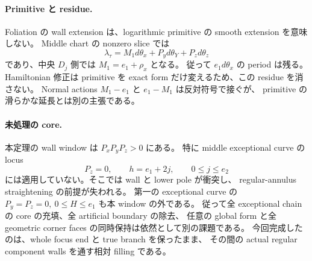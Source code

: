 \paragraph{Primitive と residue.}
Foliation の wall extension は、logarithmic primitive の smooth extension を意味しない。
Middle chart の nonzero slice では
\[
 \lambda_\tau=M_1d\theta_x+P_y d\theta_Y+P_zd\theta_z
\]
であり、中央 $D_j$ 側では $M_1=e_1+\rho_x$ となる。
従って $e_1d\theta_x$ の period は残る。
Hamiltonian 修正は primitive を exact form だけ変えるため、この residue を消さない。
Normal actions $M_1-e_1$ と $e_1-M_1$ は反対符号で接ぐが、
primitive の滑らかな延長とは別の主張である。

\paragraph{未処理の core.}
本定理の wall window は $P_xP_yP_z>0$ にある。
特に middle exceptional curve の locus
\[
 P_z=0,\qquad h=e_1+2j,\qquad 0\le j\le e_2
\]
には適用していない。そこでは wall と lower pole が衝突し、
regular-annulus straightening の前提が失われる。
第一の exceptional curve の $P_y=P_z=0,\ 0\le H\le e_1$ も本 window の外である。
従って全 exceptional chain の core の充填、全 artificial boundary の除去、
任意の global form と全 geometric corner faces の同時保持は依然として別の課題である。
今回完成したのは、whole focus end と true branch を保ったまま、
その間の actual regular component walls を通す相対 filling である。
